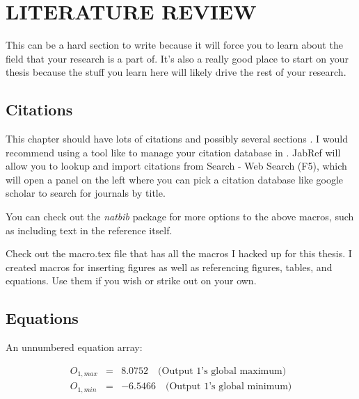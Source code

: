 

\chapter{LITERATURE REVIEW}\label{ch:overview}

This can be a hard section to write because it will force you to learn about the field that your research is a part of.
It's also a really good place to start on your thesis because the stuff you learn here will likely drive the rest of your research.

\section{Citations} \label{sec:citations}

This chapter should have lots of citations and possibly several sections \cite{biom} \cite{LDA} \cite{fasta}.
I would recommend using a tool like  to manage your citation database in .
JabRef will allow you to lookup and import citations from Search - Web Search (F5), which will open a panel on the left where you can pick a citation database like google scholar to search for journals by title.

You can check out the \emph{natbib} package for more options to the above macros, such as including text in the reference itself.

Check out the macro.tex file that has all the macros I hacked up for this thesis.  I created macros for inserting figures as well as referencing figures, tables, and equations.  Use them if you wish or strike out on your own.

\newpage
\section{Equations} \label{sec:equations}

An unnumbered equation array:

\begin{eqnarray*}
O_{1,max} &= &  8.0752 \quad \text{(Output 1's global maximum)} \\
O_{1,min} &= &-6.5466  \quad \text{(Output 1's global minimum)} 
\end{eqnarray*}


